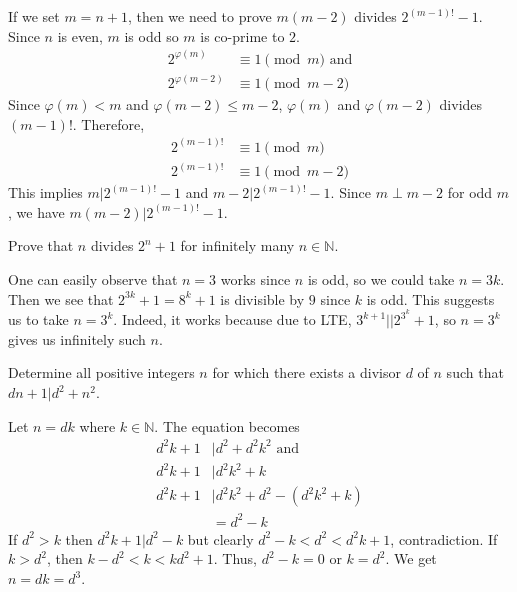 \documentclass[problems.tex]{subfile}
\begin{document}
	\begin{solution}
		If we set $m=n+1$, then we need to prove $m(m-2)$ divides $2^{(m-1)!}-1$. Since $n$ is even, $m$ is odd so $m$ is co-prime to $2$. 
			\begin{align*}
				2^{\varphi(m)} &\equiv1\pmod m\text{ and}\\
				2^{\varphi(m-2)} &\equiv1\pmod{m-2}
			\end{align*}
		Since $\varphi(m)<m$ and $\varphi(m-2)\leq m-2$, $\varphi(m)$ and $\varphi(m-2)$ divides $(m-1)!$. Therefore,
			\begin{align*}
				2^{(m-1)!} & \equiv1\pmod m\\
				2^{(m-1)!} & \equiv1\pmod{m-2}
			\end{align*}
		This implies $m|2^{(m-1)!}-1$ and $m-2|2^{(m-1)!}-1$. Since $m\perp m-2$ for odd $m$, we have $m(m-2)|2^{(m-1)!}-1$.
	\end{solution}
	
	
	
	
	\begin{problem}
		Prove that $n$ divides $2^n+1$ for infinitely many $n\in\mathbb{N}$.
	\end{problem}
	
	\begin{solution}
		One can easily observe that $n=3$ works since $n$ is odd, so we could take $n=3k$. Then we see that $2^{3k}+1=8^k+1$ is divisible by $9$ since $k$ is odd. This suggests us to take $n=3^k$. Indeed, it works because due to LTE, $3^{k+1}||2^{3^k}+1$, so $n=3^k$ gives us infinitely such $n$.
	\end{solution}
	
	\begin{problem}[Croatia $2015$]
		Determine all positive integers $n$ for which there exists a divisor $d$ of $n$ such that $dn+1|d^2+n^2$.
	\end{problem}
	
	\begin{solution}
		Let $n=dk$ where $k\in\mathbb{N}$. The equation becomes
			\begin{align*}
				d^2k+1 & |d^2+d^2k^2\text{ and}\\
				d^2k+1 & |d^2k^2+k\\
				d^2k+1 & |d^2k^2+d^2-(d^2k^2+k)\\
					   & = d^2-k
			\end{align*}
		If $d^2>k$ then $d^2k+1|d^2-k$ but clearly $d^2-k<d^2<d^2k+1$, contradiction. If $k>d^2$, then $k-d^2<k<kd^2+1$. Thus, $d^2-k=0$ or $k=d^2$. We get $n=dk=d^3$.
	\end{solution}
	
\end{document}
